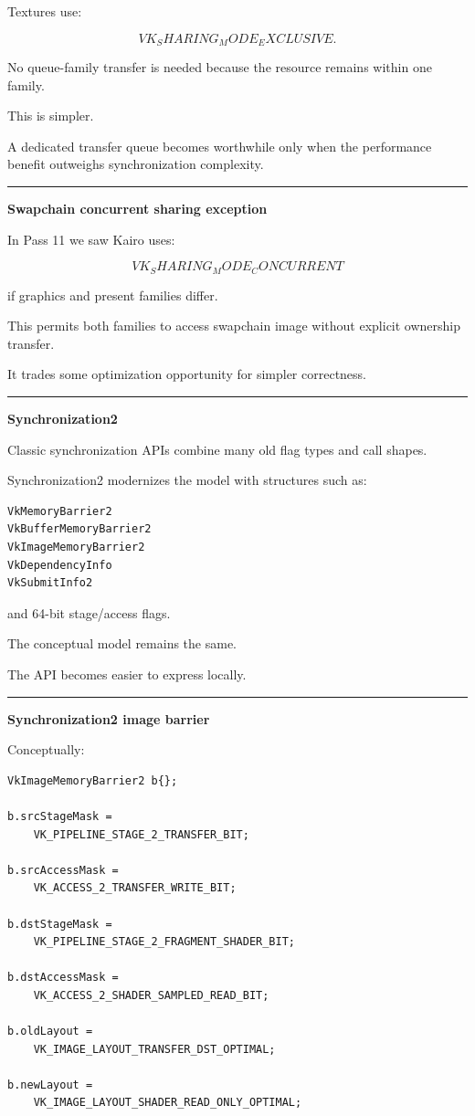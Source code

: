 Textures use:

\[
VK_SHARING_MODE_EXCLUSIVE.
\]

No queue-family transfer is needed because the resource remains within one family.

This is simpler.

A dedicated transfer queue becomes worthwhile only when the performance benefit outweighs synchronization complexity.

\begin{center}\rule{0.5\linewidth}{0.5pt}\end{center}

\textbf{Swapchain concurrent sharing exception}

In Pass 11 we saw Kairo uses:

\[
VK_SHARING_MODE_CONCURRENT
\]

if graphics and present families differ.

This permits both families to access swapchain image without explicit ownership transfer.

It trades some optimization opportunity for simpler correctness.

\begin{center}\rule{0.5\linewidth}{0.5pt}\end{center}

\textbf{Synchronization2}

Classic synchronization APIs combine many old flag types and call shapes.

Synchronization2 modernizes the model with structures such as:

\begin{verbatim}
VkMemoryBarrier2
VkBufferMemoryBarrier2
VkImageMemoryBarrier2
VkDependencyInfo
VkSubmitInfo2
\end{verbatim}

and 64-bit stage/access flags.

The conceptual model remains the same.

The API becomes easier to express locally.

\begin{center}\rule{0.5\linewidth}{0.5pt}\end{center}

\textbf{Synchronization2 image barrier}

Conceptually:

\begin{verbatim}
VkImageMemoryBarrier2 b{};

b.srcStageMask =
    VK_PIPELINE_STAGE_2_TRANSFER_BIT;

b.srcAccessMask =
    VK_ACCESS_2_TRANSFER_WRITE_BIT;

b.dstStageMask =
    VK_PIPELINE_STAGE_2_FRAGMENT_SHADER_BIT;

b.dstAccessMask =
    VK_ACCESS_2_SHADER_SAMPLED_READ_BIT;

b.oldLayout =
    VK_IMAGE_LAYOUT_TRANSFER_DST_OPTIMAL;

b.newLayout =
    VK_IMAGE_LAYOUT_SHADER_READ_ONLY_OPTIMAL;
\end{verbatim}


